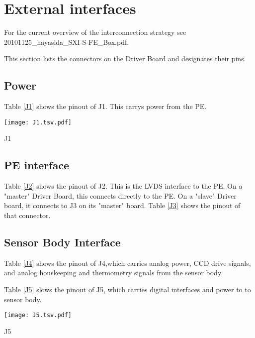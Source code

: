 \section{External interfaces}

For the current overview of the interconnection strategy see 20101125\_hayasida\_SXI-S-FE\_Box.pdf.

This section lists the connectors on the Driver Board and designates their pins.

\subsection{Power}

Table \ref{J1} shows the pinout of J1. This carrys power from the PE.

\begin{table}[h]
\centering
\texttt{[image: J1.tsv.pdf]}
\caption{J1}
\label{J1}
\end{table}

\subsection{PE interface}

Table \ref{J2} shows the pinout of J2. This is the LVDS interface to the PE. On a "master" Driver Board, this connects directly to the PE. On a "slave" Driver board, it connects to J3 on its "master" board. Table \ref{J3} shows the pinout of that connector.


\subsection{Sensor Body Interface}

Table \ref{J4} shows the pinout of J4,which carries analog power, CCD drive signals, and analog houskeeping and thermometry signals from the sensor body.


Table \ref{J5} slows the pinout of J5, which carries digital interfaces and power to to sensor body.

\begin{table}[h]
\centering
\texttt{[image: J5.tsv.pdf]}
\caption{J5}
\label{J5}
\end{table}

